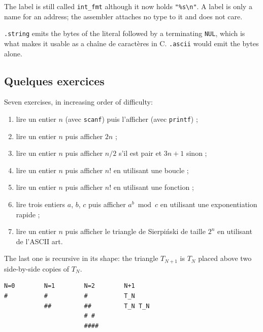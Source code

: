\begin{remark}
  The label is still called \texttt{int\_fmt} although it now holds
  \verb|"%s\n"|. A label is only a name for an address; the assembler attaches
  no type to it and does not care.
\end{remark}

\begin{remark}
  \texttt{.string} emits the bytes of the literal followed by a terminating
  \texttt{NUL}, which is what makes it usable as a chaîne de caractères in C.
  \texttt{.ascii}
  would emit the bytes alone.
\end{remark}

\subsection{Quelques exercices}
Seven exercises, in increasing order of difficulty:
\begin{enumerate}
  \item lire un entier $n$ (avec \texttt{scanf}) puis l'afficher (avec
    \texttt{printf}) ;
  \item lire un entier $n$ puis afficher $2n$ ;
  \item lire un entier $n$ puis afficher $n/2$ s'il est pair et $3n+1$ sinon ;
  \item lire un entier $n$ puis afficher $n!$ en utilisant une boucle ;
  \item lire un entier $n$ puis afficher $n!$ en utilisant une fonction ;
  \item lire trois entiers $a$, $b$, $c$ puis afficher $a^{b} \bmod c$ en
    utilisant une exponentiation rapide ;
  \item lire un entier $n$ puis afficher le triangle de Sierpiński de taille
    $2^{n}$ en utilisant de l'ASCII art.
\end{enumerate}

The last one is recursive in its shape: the triangle $T_{N+1}$ is $T_{N}$ placed
above two side-by-side copies of $T_{N}$.
\begin{lstlisting}
N=0        N=1        N=2        N+1
#          #          #          T_N
           ##         ##         T_N T_N
                      # #
                      ####
\end{lstlisting}

